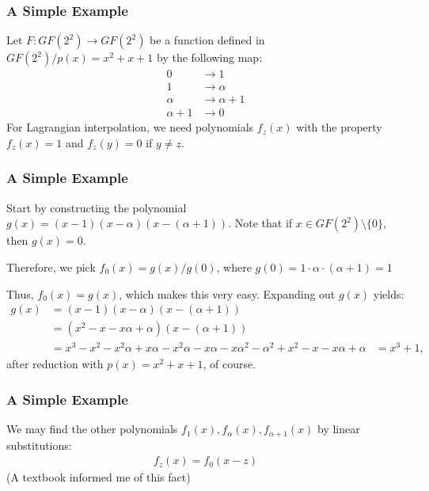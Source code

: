 \documentclass[handout]{beamer}
\begin{document}
\begin{frame}
	\frametitle{A Simple Example}
	Let $F : GF(2^2) \to GF(2^2)$ be a function defined in $GF(2^2)/p(x) = x^2 + x + 1$ by the following map:
	\begin{align*}
		0 & \to 1 \\
		1 & \to \alpha \\ 
		\alpha & \to \alpha + 1\\
		\alpha + 1 & \to 0
	\end{align*}
	For Lagrangian interpolation, we need polynomials $f_z(x)$ with the property $f_z(x) = 1$ and $f_z(y) = 0$ if $y \not= z$.
\end{frame}

\begin{frame}
	\frametitle{A Simple Example}
	Start by constructing the polynomial $g(x) = (x - 1)(x - \alpha)(x - (\alpha + 1))$. Note that if $x \in GF(2^2) \setminus \{0\}$, then
	$g(x) = 0$.
	
	\medskip
	
	Therefore, we pick $f_0(x) = g(x) / g(0)$, where $g(0) = 1 \cdot \alpha \cdot (\alpha + 1) = 1$
	
	\medskip
	
	Thus, $f_0(x) = g(x)$, which makes this very easy. Expanding out $g(x)$ yields:
	\begin{align*}
		g(x) & = (x-1)(x-\alpha)(x-(\alpha+1)) \\
		& = (x^2 - x - x\alpha + \alpha)(x-(\alpha+1))\\
		& = x^3 - x^2 -x^2\alpha + x\alpha - x^2\alpha - x\alpha - x\alpha^2 -\alpha^2 +x^2 -x -x\alpha + \alpha
		& = x^3 + 1,
	\end{align*}
	after reduction with $p(x) = x^2 + x + 1$, of course.
\end{frame}

\begin{frame}
	\frametitle{A Simple Example}
	We may find the other polynomials $f_1(x), f_{\alpha}(x), f_{\alpha+1}(x)$ by linear substitutions:
	\begin{align*}
		f_z(x) = f_0(x-z)
	\end{align*}
	(A textbook informed me of this fact)
\end{frame}
\end{document}
